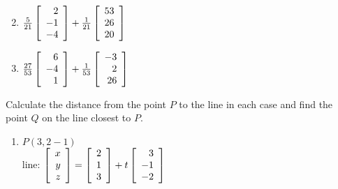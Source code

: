 \begin{multicols}{2}
\begin{ex}
\begin{enumerate}[label={\alph*.}]
\end{enumerate}
\begin{sol}
\begin{enumerate}[label={\alph*.}]
\setcounter{enumi}{1}
\item  $\tfrac{5}{21}\left[
\begin{array}{r}
2\\
-1\\
-4
\end{array}
\right]
+
\tfrac{1}{21}\left[
\begin{array}{r}
53\\
26\\
20
\end{array}
\right]$

\setcounter{enumi}{3}
\item  
$\tfrac{27}{53}\left[
\begin{array}{r}
6\\
-4\\
1
\end{array}
\right]
+
\tfrac{1}{53}\left[
\begin{array}{r}
-3\\
2\\
26
\end{array}
\right]$


\end{enumerate}
\end{sol}
\end{ex}

\begin{ex}
Calculate the distance from the point $P$ to the line in each case and find the point $Q$ on the line closest to $P$.


\begin{enumerate}[label={\alph*.}]
\item $P(3,2-1) \quad $ \\ line:  $\left[
\begin{array}{r}
x\\
y\\
z
\end{array}
\right]
=
\left[
\begin{array}{r}
2\\
1\\
3
\end{array}
\right]
+t
\left[
\begin{array}{r}
3\\
-1\\
-2
\end{array}
\right]
$


\end{enumerate}
\end{ex}
\end{multicols}
